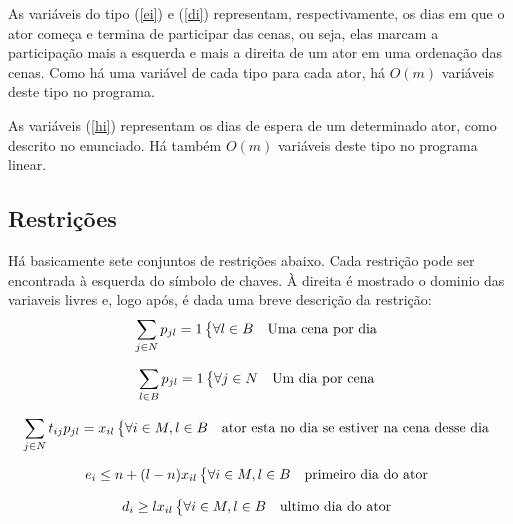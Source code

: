 \documentclass[a4paper,11pt]{article}
\begin{document}
As variáveis do tipo (\ref{ei}) e (\ref{di}) representam, respectivamente, os dias em que o ator
começa e termina de participar das cenas, ou seja, elas marcam a participação
mais a esquerda e mais a direita de um ator em uma ordenação das cenas. Como há
uma variável de cada tipo para cada ator, há $O(m)$ variáveis deste tipo no programa.

As variáveis (\ref{hi}) representam os dias de espera de um determinado ator, como
descrito no enunciado. Há também $O(m)$ variáveis deste tipo no programa linear.
\subsection{Restrições}
Há basicamente sete conjuntos de restrições abaixo. Cada restrição pode ser encontrada
à esquerda do símbolo de chaves. À direita é mostrado o dominio das variaveis livres
e, logo após, é dada uma breve descrição da restrição:
\begin{equation}
  \sum_{j \in N} p_{jl} = 1 \begin{dcases*} \forall l \in B & Uma cena por dia \end{dcases*}
  \label{cena_dia}
\end{equation}

\begin{equation}
  \sum_{l \in B} p_{jl} = 1 \begin{dcases*} \forall j \in N & Um dia por cena \end{dcases*}
  \label{dia_cena}
\end{equation}

\begin{equation}
  \sum_{j \in N} t_{ij} p_{jl} = x_{il} \begin{dcases*} \forall i \in M, l \in B & ator esta no dia se estiver na cena desse dia \end{dcases*}
  \label{actor_cene_day}
\end{equation}

\begin{equation}
  e_{i} \leq n + (l-n)x_{il} \begin{dcases*} \forall i \in M, l \in B & primeiro dia do ator \end{dcases*}
  \label{first_day}
\end{equation}

\begin{equation}
  d_{i} \geq lx_{il} \begin{dcases*} \forall i \in M, l \in B & ultimo dia do ator \end{dcases*}
  \label{last_day}
\end{equation}
\end{document}
